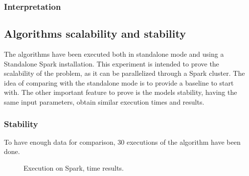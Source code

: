 \documentclass[11pt]{book} %
\begin{document}
      \subsubsection*{Interpretation}






    \subsection{Algorithms scalability and stability}

      The algorithms have been executed both in standalone mode and using a Standalone Spark installation. This experiment is intended to prove the scalability of the problem, as it can be parallelized through a Spark cluster. The idea of comparing with the standalone mode is to provide a baseline to start with. The other important feature to prove is the models stability, having the same input parameters, obtain similar execution times and results.

      \subsubsection{Stability}

        To have enough data for comparison, $30$ executions of the algorithm have been done.

        \begin{figure}[!ht]
          \hfill
          \caption{Execution on Spark, time results.}
        \end{figure}
\end{document}
